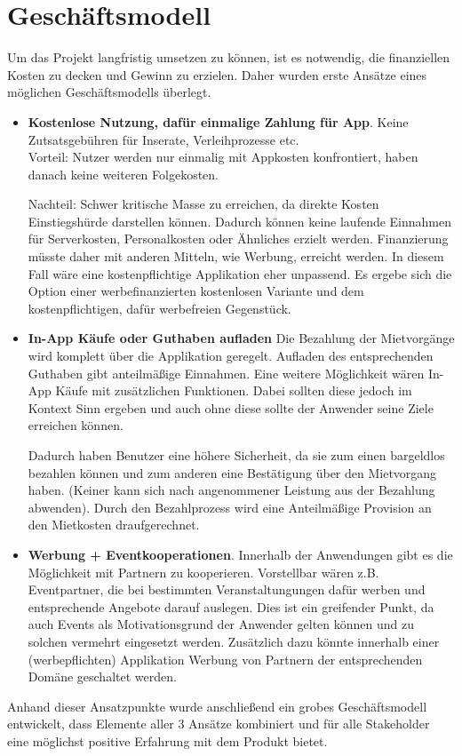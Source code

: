 
\chapter{Geschäftsmodell}

Um das Projekt langfristig umsetzen zu können, ist es notwendig, die finanziellen Kosten zu decken und Gewinn zu erzielen. 
Daher wurden erste Ansätze eines möglichen Geschäftsmodells überlegt.

\begin{itemize}
   \item \textbf{Kostenlose Nutzung, dafür einmalige Zahlung für App}. Keine Zutsatsgebühren für Inserate, Verleihprozesse etc.\\
   Vorteil: Nutzer werden nur einmalig mit Appkosten konfrontiert, haben danach keine weiteren Folgekosten.

   Nachteil: Schwer kritische Masse zu erreichen, da direkte Kosten Einstiegshürde darstellen können. Dadurch können keine laufende Einnahmen für Serverkosten, Personalkosten oder Ähnliches erzielt werden. Finanzierung müsste daher mit anderen Mitteln, wie Werbung, erreicht werden. In diesem Fall wäre eine kostenpflichtige Applikation eher unpassend. Es ergebe sich die Option einer werbefinanzierten kostenlosen Variante und dem kostenpflichtigen, dafür werbefreien Gegenstück.\\


   \item \textbf{In-App Käufe oder Guthaben aufladen} 
   Die Bezahlung der Mietvorgänge wird komplett über die Applikation geregelt. Aufladen des entsprechenden Guthaben gibt anteilmäßige Einnahmen. Eine weitere Möglichkeit wären In-App Käufe mit zusätzlichen Funktionen. Dabei sollten diese jedoch im Kontext Sinn ergeben und auch ohne diese sollte der Anwender seine Ziele erreichen können. 
   
   Dadurch haben Benutzer eine höhere Sicherheit, da sie zum einen bargeldlos bezahlen können und zum anderen eine Bestätigung über den Mietvorgang haben. (Keiner kann sich nach angenommener Leistung aus der Bezahlung abwenden). Durch den Bezahlprozess wird eine Anteilmäßige Provision an den Mietkosten draufgerechnet. 
\\

   \item \textbf{Werbung + Eventkooperationen}.
   Innerhalb der Anwendungen gibt es die Möglichkeit mit Partnern zu kooperieren. Vorstellbar wären z.B. Eventpartner, die bei bestimmten Veranstaltungungen dafür werben und entsprechende Angebote darauf auslegen. Dies ist ein greifender Punkt, da auch Events als Motivationsgrund der Anwender gelten können und zu solchen vermehrt eingesetzt werden. Zusätzlich dazu könnte innerhalb einer (werbepflichten) Applikation Werbung von Partnern der entsprechenden Domäne geschaltet werden.

\end{itemize}

\newpage
Anhand dieser Ansatzpunkte wurde anschließend ein grobes Geschäftsmodell entwickelt, dass Elemente aller 3 Ansätze kombiniert und für alle Stakeholder eine möglichst positive Erfahrung mit dem Produkt bietet.